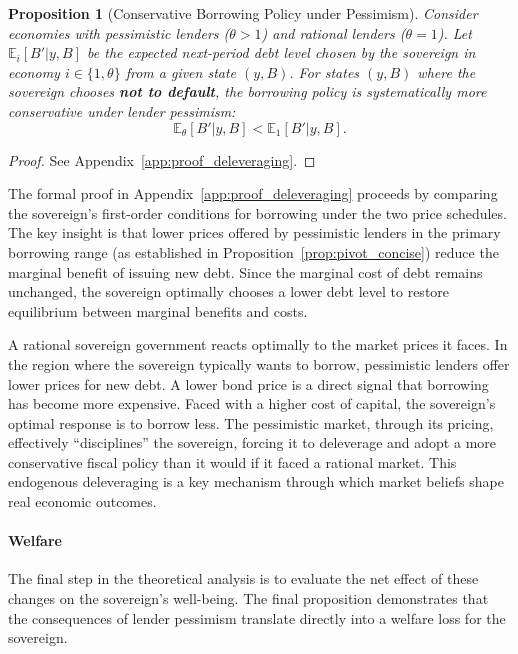 \documentclass[12pt]{article}
\theoremstyle{plain}
\newtheorem{proposition}{Proposition}
\begin{document}
\begin{proposition}[Conservative Borrowing Policy under Pessimism]
	\label{prop:deleveraging}
	Consider economies with pessimistic lenders ($\theta > 1$) and rational lenders ($\theta = 1$). Let $\mathbb{E}_i[B'|y, B]$ be the expected next-period debt level chosen by the sovereign in economy $i \in \{1, \theta\}$ from a given state $(y, B)$. For states $(y, B)$ where the sovereign chooses \textbf{not to default}, the borrowing policy is systematically more conservative under lender pessimism:
	\begin{equation*}
		\mathbb{E}_\theta[B'|y, B] < \mathbb{E}_1[B'|y, B].
	\end{equation*}
\end{proposition}

\begin{proof}
	See Appendix~\ref{app:proof_deleveraging}.
\end{proof}

The formal proof in Appendix~\ref{app:proof_deleveraging} proceeds by comparing
the sovereign's first-order conditions for borrowing under the two price
schedules. The key insight is that lower prices offered by pessimistic lenders
in the primary borrowing range (as established in
Proposition~\ref{prop:pivot_concise}) reduce the marginal benefit of issuing
new debt. Since the marginal cost of debt remains unchanged, the sovereign
optimally chooses a lower debt level to restore equilibrium between marginal
benefits and costs.

A rational sovereign government reacts optimally to the market prices it faces.
In the region where the sovereign typically wants to borrow, pessimistic
lenders offer lower prices for new debt. A lower bond price is a direct signal
that borrowing has become more expensive. Faced with a higher cost of capital,
the sovereign's optimal response is to borrow less. The pessimistic market,
through its pricing, effectively ``disciplines'' the sovereign, forcing it to
deleverage and adopt a more conservative fiscal policy than it would if it
faced a rational market. This endogenous deleveraging is a key mechanism
through which market beliefs shape real economic outcomes.

\paragraph{Welfare}
The final step in the theoretical analysis is to evaluate the net effect of
these changes on the sovereign's well-being. The final proposition demonstrates
that the consequences of lender pessimism translate directly into a welfare
loss for the sovereign.
\end{document}
